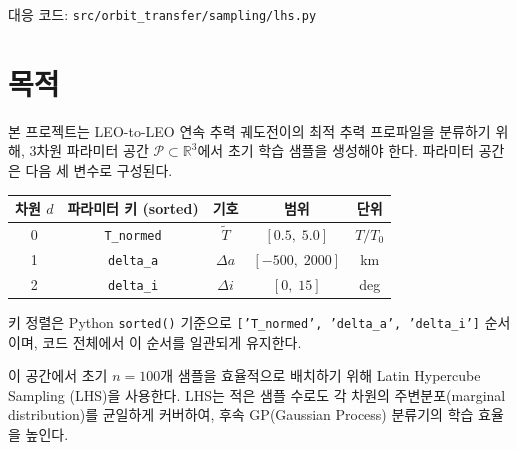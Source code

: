 \documentclass[11pt]{article}
\begin{document}
\drawborder
\thispagestyle{firstpage}

\def\lighterdate{February 12, 2026}

\begin{abstract}
본 문서는 LEO-to-LEO 연속 추력 궤도전이의 최적 추력 프로파일을 분류하기 위해,
3차원 파라미터 공간 $\mathcal{P} \subset \mathbb{R}^3$에서 초기 학습 샘플을 생성하는
Latin Hypercube Sampling (LHS) 설계를 기술한다.
LHS는 적은 샘플 수로도 각 차원의 주변분포를 균일하게 커버하여,
후속 GP 분류기의 학습 효율을 높인다.
수학적 배경, 구현 매핑, 수치 검증을 포함한다.
\end{abstract}

\noindent 대응 코드: \texttt{src/orbit\_transfer/sampling/lhs.py}


\section{목적}

본 프로젝트는 LEO-to-LEO 연속 추력 궤도전이의 최적 추력 프로파일을 분류하기 위해,
3차원 파라미터 공간 $\mathcal{P} \subset \mathbb{R}^3$에서 초기 학습 샘플을 생성해야 한다.
파라미터 공간은 다음 세 변수로 구성된다.

\begin{table}[h]
\centering
\begin{tabular}{ccccc}
\toprule
차원 $d$ & 파라미터 키 (sorted) & 기호 & 범위 & 단위 \\
\midrule
0 & \texttt{T\_normed} & $\tilde{T}$ & $[0.5,\; 5.0]$ & $T/T_0$ \\
1 & \texttt{delta\_a} & $\Delta a$ & $[-500,\; 2000]$ & km \\
2 & \texttt{delta\_i} & $\Delta i$ & $[0,\; 15]$ & deg \\
\bottomrule
\end{tabular}
\end{table}

키 정렬은 Python \texttt{sorted()} 기준으로 \texttt{['T\_normed', 'delta\_a', 'delta\_i']} 순서이며,
코드 전체에서 이 순서를 일관되게 유지한다.

이 공간에서 초기 $n = 100$개 샘플을 효율적으로 배치하기 위해 Latin Hypercube Sampling (LHS)을 사용한다.
LHS는 적은 샘플 수로도 각 차원의 주변분포(marginal distribution)를 균일하게 커버하여,
후속 GP(Gaussian Process) 분류기의 학습 효율을 높인다.
\end{document}

